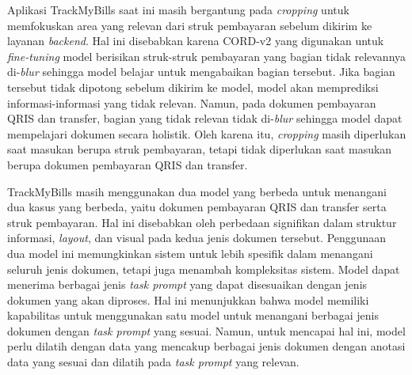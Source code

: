 Aplikasi TrackMyBills saat ini masih bergantung pada \emph{cropping} untuk memfokuskan area yang relevan dari struk pembayaran sebelum dikirim ke layanan \emph{backend}. Hal ini disebabkan karena \dataset{} CORD-v2 yang digunakan untuk \emph{fine-tuning} model \donut{} berisikan struk-struk pembayaran yang bagian tidak relevannya di-\emph{blur} sehingga model belajar untuk mengabaikan bagian tersebut. Jika bagian tersebut tidak dipotong sebelum dikirim ke model, model akan memprediksi informasi-informasi yang tidak relevan. Namun, pada dokumen pembayaran QRIS dan transfer, bagian yang tidak relevan tidak di-\emph{blur} sehingga model \donut{} dapat mempelajari dokumen secara holistik. Oleh karena itu, \emph{cropping} masih diperlukan saat masukan berupa struk pembayaran, tetapi tidak diperlukan saat masukan berupa dokumen pembayaran QRIS dan transfer.

TrackMyBills masih menggunakan dua model yang berbeda untuk menangani dua kasus yang berbeda, yaitu dokumen pembayaran QRIS dan transfer serta struk pembayaran. Hal ini disebabkan oleh perbedaan signifikan dalam struktur informasi, \emph{layout}, dan visual pada kedua jenis dokumen tersebut. Penggunaan dua model ini memungkinkan sistem untuk lebih spesifik dalam menangani seluruh jenis dokumen, tetapi juga menambah kompleksitas sistem. Model \donut{} dapat menerima berbagai jenis \emph{task prompt} yang dapat disesuaikan dengan jenis dokumen yang akan diproses. Hal ini menunjukkan bahwa model \donut{} memiliki kapabilitas untuk menggunakan satu model untuk menangani berbagai jenis dokumen dengan \emph{task prompt} yang sesuai. Namun, untuk mencapai hal ini, model perlu dilatih dengan data yang mencakup berbagai jenis dokumen dengan anotasi data yang sesuai dan dilatih pada \emph{task prompt} yang relevan.
